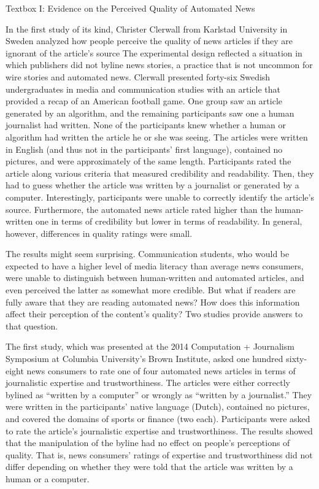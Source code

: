 \documentclass[notoc, symmetric, nobib, nols]{towcenter-guideto-book}
\begin{document}
\begin{framed}
Textbox I: Evidence on the Perceived Quality of Automated News 

In the first study of its kind, Christer Clerwall from Karlstad University in Sweden analyzed how people perceive the quality of news articles if they are ignorant of the article's source\autocite{clerwall15} The experimental design reflected a situation in which publishers did not byline news stories, a practice that is not uncommon for wire stories and automated news.\autocite{ulanoff14} Clerwall presented forty-six Swedish undergraduates in media and communication studies with an article that provided a recap of an American football game. One group saw an article generated by an algorithm, and the remaining participants saw one a human journalist had written. None of the participants knew whether a human or algorithm had written the article he or she was seeing. The articles were written in English (and thus not in the participants' first language), contained no pictures, and were approximately of the same length. Participants rated the article along various criteria that measured credibility and readability. Then, they had to guess whether the article was written by a journalist or generated by a computer. Interestingly, participants were unable to correctly identify the article's source. Furthermore, the automated news article rated higher than the human-written one in terms of credibility but lower in terms of readability. In general, however, differences in quality ratings were small.

The results might seem surprising. Communication students, who would be expected to have a higher level of media literacy than average news consumers, were unable to distinguish between human-written and automated articles, and even perceived the latter as somewhat more credible. But what if readers are fully aware that they are reading automated news? How does this information affect their perception of the content's quality? Two studies provide answers to that question. 

The first study, which was presented at the 2014 Computation + Journalism Symposium at Columbia University's Brown Institute, asked one hundred sixty-eight news consumers to rate one of four automated news articles in terms of journalistic expertise and trustworthiness.\autocite{kaa14} The articles were either correctly bylined as ``written by a computer'' or wrongly as ``written by a journalist.'' They were written in the participants' native language (Dutch), contained no pictures, and covered the domains of sports or finance (two each). Participants were asked to rate the article's journalistic expertise and trustworthiness. The results showed that the manipulation of the byline had no effect on people's perceptions of quality. That is, news consumers' ratings of expertise and trustworthiness did not differ depending on whether they were told that the article was written by a human or a computer. 


\end{framed}
\end{document}
